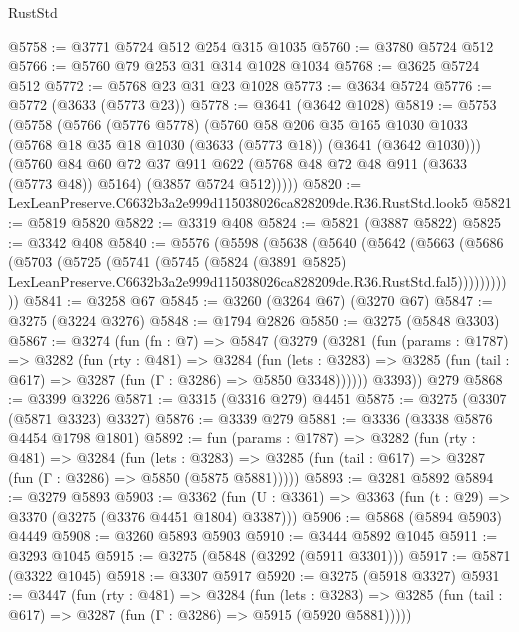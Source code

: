\begin{lexlean}{RustStd}
\begin{coremodule}
@5758 := @3771 @5724 @512 @254 @315 @1035
@5760 := @3780 @5724 @512
@5766 := @5760 @79 @253 @31 @314 @1028 @1034
@5768 := @3625 @5724 @512
@5772 := @5768 @23 @31 @23 @1028
@5773 := @3634 @5724
@5776 := @5772 (@3633 (@5773 @23))
@5778 := @3641 (@3642 @1028)
@5819 := @5753
    (@5758
      (@5766
        (@5776 @5778)
        (@5760
          @58
          @206
          @35
          @165
          @1030
          @1033
          (@5768 @18 @35 @18 @1030 (@3633 (@5773 @18)) (@3641 (@3642 @1030)))
          (@5760
            @84
            @60
            @72
            @37
            @911
            @622
            (@5768 @48 @72 @48 @911 (@3633 (@5773 @48)) @5164)
            (@3857 @5724 @512)))))
@5820 := LexLeanPreserve.C6632b3a2e999d115038026ca828209de.R36.RustStd.look5
@5821 := @5819 @5820
@5822 := @3319 @408
@5824 := @5821 (@3887 @5822)
@5825 := @3342 @408
@5840 := @5576
    (@5598
      (@5638
        (@5640
          (@5642
            (@5663
              (@5686
                (@5703
                  (@5725
                    (@5741
                      (@5745
                        (@5824
                          (@3891 @5825)
                          LexLeanPreserve.C6632b3a2e999d115038026ca828209de.R36.RustStd.fal5)))))))))))
@5841 := @3258 @67
@5845 := @3260 (@3264 @67) (@3270 @67)
@5847 := @3275 (@3224 @3276)
@5848 := @1794 @2826
@5850 := @3275 (@5848 @3303)
@5867 := @3274
    (fun (fn : @7) =>
    @5847
      (@3279
        (@3281
          (fun (params : @1787) =>
          @3282
            (fun (rty : @481) =>
            @3284
              (fun (lets : @3283) =>
              @3285 (fun (tail : @617) => @3287 (fun (Γ : @3286) => @5850 @3348))))))
        @3393))
    @279
@5868 := @3399 @3226
@5871 := @3315 (@3316 @279) @4451
@5875 := @3275 (@3307 (@5871 @3323) @3327)
@5876 := @3339 @279
@5881 := @3336 (@3338 @5876 @4454 @1798 @1801)
@5892 := fun (params : @1787) =>
  @3282
    (fun (rty : @481) =>
    @3284
      (fun (lets : @3283) =>
      @3285 (fun (tail : @617) => @3287 (fun (Γ : @3286) => @5850 (@5875 @5881)))))
@5893 := @3281 @5892
@5894 := @3279 @5893
@5903 := @3362 (fun (U : @3361) => @3363 (fun (t : @29) => @3370 (@3275 (@3376 @4451 @1804) @3387)))
@5906 := @5868 (@5894 @5903) @4449
@5908 := @3260 @5893 @5903
@5910 := @3444 @5892 @1045
@5911 := @3293 @1045
@5915 := @3275 (@5848 (@3292 (@5911 @3301)))
@5917 := @5871 (@3322 @1045)
@5918 := @3307 @5917
@5920 := @3275 (@5918 @3327)
@5931 := @3447
    (fun (rty : @481) =>
    @3284
      (fun (lets : @3283) =>
      @3285 (fun (tail : @617) => @3287 (fun (Γ : @3286) => @5915 (@5920 @5881)))))

\end{coremodule}
\end{lexlean}
